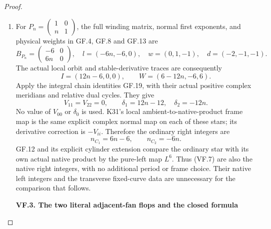 \begin{proof}
\begin{enumerate}[label=\arabic*.]
\par

\medskip\noindent\textbf{VF.2. The exact native right integers on each shear fan}

\par\nobreak

\item For \(P_n=\begin{pmatrix}1&0\\n&1\end{pmatrix}\), the full
winding matrix, normal first exponents, and physical weights in
GF.4, GF.8 and GF.13 are
\[
 B_{P_n}=\begin{pmatrix}-6&0\\6n&0\end{pmatrix},\quad
 l=(-6n,-6,0),\quad
 w=(0,1,-1),\quad d=(-2,-1,-1).                       \tag{VF.4}
\]
The actual local orbit and stable-derivative traces are consequently
\[
 I=(12n-6,0,0),\qquad W=(6-12n,-6,6).                 \tag{VF.5}
\]
Apply the integral chain identities GF.19, with their actual
positive complex meridians and relative dual cycles. They give
\[
 V_{11}=V_{22}=0,\qquad
             \delta_1=12n-12,\quad\delta_2=-12n.      \tag{VF.6}
\]
No value of \(V_{00}\) or \(\delta_0\) is used. K31's local
ambient-to-native-product frame map is the same explicit complex
normal map on each of these stars; its derivative correction is
\(-V_{ii}\). Therefore the ordinary right integers are
\[
              n_{C_1}=6n-6,\qquad n_{C_2}=-6n.         \tag{VF.7}
\]
GF.12 and its explicit cylinder extension compare the ordinary
star with its own actual native product by the pure-left map
\(L^6\). Thus (VF.7) are also the native right integers, with no
additional period or frame choice. Their native left integers and
the transverse fixed-curve data are unnecessary for the comparison
that follows.

\par

\medskip\noindent\textbf{VF.3. The two literal adjacent-fan flops and the closed formula}

\par\nobreak


\end{enumerate}
\end{proof}
